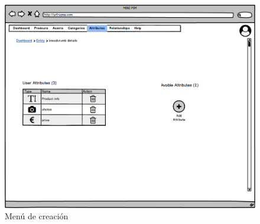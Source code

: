 \begin{figure}[H]
    \includegraphics[width=1\linewidth]{mockups/RF6_2 Leer Atributo.png}
    \caption{Menú de creación}
   \end{figure}
\vspace{1.0cm}

\newpage %